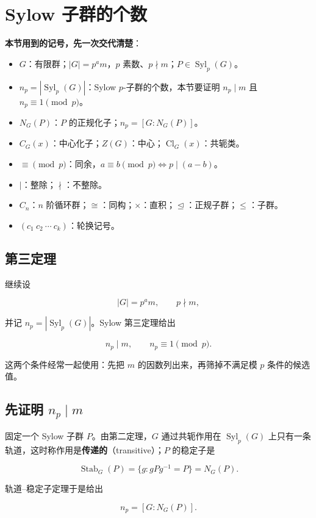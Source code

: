 \section{Sylow 子群的个数}


\textbf{本节用到的记号，先一次交代清楚}：

\begin{itemize}
\item $G$：有限群；$|G|=p^am$，$p$ 素数、$p\nmid m$；$P\in\operatorname{Syl}_p(G)$。
\item $n_p=|\operatorname{Syl}_p(G)|$：Sylow $p$-子群的个数，本节要证明 $n_p\mid m$ 且 $n_p\equiv1\pmod p$。
\item $N_G(P)$：$P$ 的正规化子；$n_p=[G:N_G(P)]$。
\item $C_G(x)$：中心化子；$Z(G)$：中心；$\operatorname{Cl}_G(x)$：共轭类。
\item $\equiv\pmod p$：同余，$a\equiv b\pmod p\iff p\mid(a-b)$。
\item $\mid$：整除；$\nmid$：不整除。
\item $C_n$：$n$ 阶循环群；$\cong$：同构；$\times$：直积；$\trianglelefteq$：正规子群；$\le$：子群。
\item $(c_1\ c_2\ \cdots\ c_k)$：轮换记号。
\end{itemize}


\subsection{第三定理}


继续设

\[
|G|=p^a m,\qquad p\nmid m,
\]

并记 $n_p=|\operatorname{Syl}_p(G)|$。Sylow 第三定理给出

\[
n_p\mid m,
\qquad
n_p\equiv1\pmod p.
\]

这两个条件经常一起使用：先把 $m$ 的因数列出来，再筛掉不满足模 $p$ 条件的候选值。

\subsection{先证明 $n_p\mid m$}


固定一个 Sylow 子群 $P$。由第二定理，$G$ 通过共轭作用在 $\operatorname{Syl}_p(G)$ 上只有一条轨道，这时称作用是\textbf{传递的}（transitive）；$P$ 的稳定子是

\[
\operatorname{Stab}_G(P)=\{g:gPg^{-1}=P\}=N_G(P).
\]

轨道--稳定子定理于是给出

\[
n_p=[G:N_G(P)].
\]

